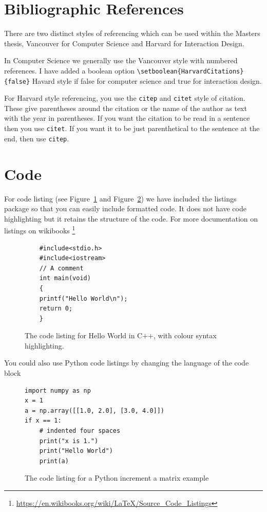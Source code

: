 \section{Bibliographic References}

There are two distinct styles of referencing which can be used within the Masters thesis, Vancouver for Computer Science and Harvard for Interaction Design.

In Computer Science we generally use the Vancouver style with numbered references.  
I have added a boolean option \verb|\setboolean{HarvardCitations}{false}|  Havard style if false for computer science and true for interaction design.
 


For Harvard style referencing, you use the \texttt{citep} and \texttt{citet} style of citation. 
These give parentheses around the citation or the name of the author as text with the year in parentheses.  
If you want the citation to be read in a sentence then you use  \texttt{citet}. 
If you want it to be just parenthetical to the sentence at the end, then use \texttt{citep}.

\section{Code}

For code listing (see Figure~\ref{fig:HelloWorldC++} and Figure~\ref{fig:PythonCode}) we have included the listings package so that you can easily include formatted code.  It does not have code highlighting but it retains the structure of the code.  For more documentation on listings on wikibooks \footnote{\url{https://en.wikibooks.org/wiki/LaTeX/Source_Code_Listings}}


\begin{figure}[tp] 
  \centering
{}
\begin{lstlisting}
    #include<stdio.h>
    #include<iostream>
    // A comment
    int main(void)
    {
    printf("Hello World\n");
    return 0;
    }
\end{lstlisting}
  \caption[Hello World C++]{The code listing for Hello World in C++, with colour syntax highlighting.}
  \label{fig:HelloWorldC++}
\end{figure}

You could also use Python code listings by changing the language of the code block

\begin{figure}[tp] 
  \centering
\lstset{language=Python}
\begin{lstlisting}
import numpy as np
x = 1
a = np.array([[1.0, 2.0], [3.0, 4.0]])
if x == 1:
    # indented four spaces
    print("x is 1.")
    print("Hello World")
    print(a)
\end{lstlisting}
  \caption[Python code example]{The code listing for a Python increment a matrix example}
  \label{fig:PythonCode}
\end{figure}

